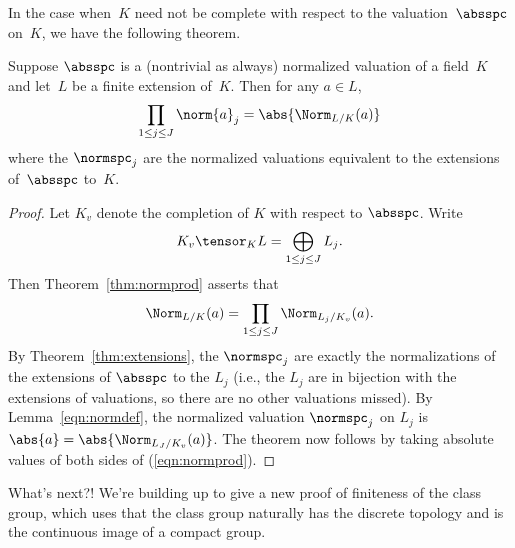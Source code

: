 \documentclass[11pt]{book}
\begin{document}
\begin{ch}
In the case when~$K$ need not be complete with respect
to the valuation~$\absspc$ on~$K$, we have the following
theorem.
\begin{theorem}\label{thm:normprod}
Suppose $\absspc$ is a (nontrivial as always) normalized valuation
of a field~$K$ and let~$L$ be a finite extension of~$K$.
Then for any $a\in L$,
$$
   \prod_{1\leq j \leq J} \norm{a}_j = \abs{\Norm_{L/K}(a)}
$$
where the $\normspc_j$ are the normalized valuations equivalent
to the extensions of~$\absspc$ to~$K$.
\end{theorem}
\begin{proof}
Let $K_v$ denote the completion of $K$ with respect to
$\absspc$.  Write
$$
  K_v\tensor_K L = \bigoplus_{1\leq j \leq J} L_j.
$$
Then Theorem~\ref{thm:normprod} asserts that
\begin{equation}\label{eqn:normprod}
 \Norm_{L/K}(a) = \prod_{1\leq j\leq J} \Norm_{L_j/K_v}(a).
\end{equation}
By Theorem~\ref{thm:extensions}, the $\normspc_j$ are exactly the
normalizations of the extensions of $\absspc$ to the $L_j$ (i.e., the
$L_j$ are in bijection with the extensions of valuations, so there are
no other valuations missed).  By Lemma~\ref{eqn:normdef}, the
normalized valuation $\normspc_j$ on $L_j$ is $\abs{a} =
\abs{\Norm_{L_J/K_v}(a)}$.  The theorem now follows by taking absolute
values of both sides of (\ref{eqn:normprod}).
\end{proof}

What's next?!  We're building up to give a new proof of finiteness of
the class group, which uses that the class group naturally has the
discrete topology and is the continuous image of a compact group.
\end{ch}
\end{document}

